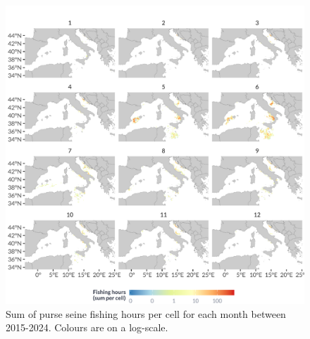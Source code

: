 \begin{figure}[H]
	\centering
	\includegraphics[width=1\linewidth, trim=0 0 0 0,clip]{Figures/plots/pss_monthly.pdf}
	\caption{Sum of purse seine fishing hours per cell for each month between 2015-2024. Colours are on a log-scale.}
	\label{fig:pss_monthly}
\end{figure}

